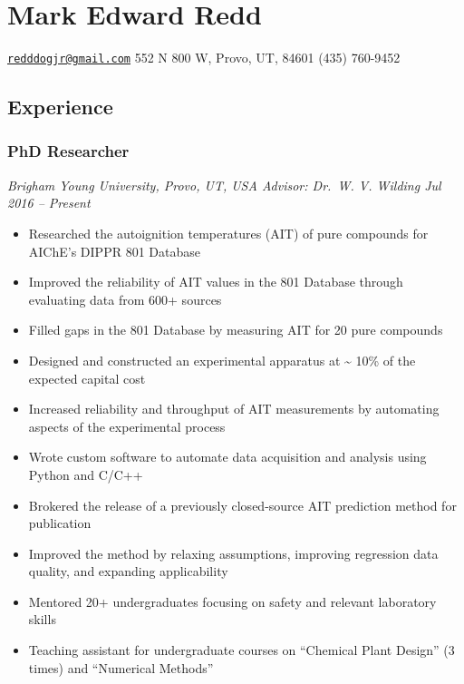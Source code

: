 
\hypertarget{mark-edward-redd}{%
\section{Mark Edward Redd}\label{mark-edward-redd}}

\href{mailto:redddogjr@gmail.com}{\nolinkurl{redddogjr@gmail.com}}
\textbar{} 552 N 800 W, Provo, UT, 84601 \textbar{} (435) 760-9452


\hypertarget{experience}{%
\subsection{Experience}\label{experience}}

\hypertarget{phd-researcher}{%
\subsubsection{PhD Researcher}\label{phd-researcher}}

\emph{Brigham Young University, Provo, UT, USA \textbar{} Advisor:
Dr.~W. V. Wilding \textbar{} Jul 2016 -- Present}

\begin{itemize}
\tightlist
\item
  Researched the autoignition temperatures (AIT) of pure compounds for
  AIChE's DIPPR 801 Database
\item
  Improved the reliability of AIT values in the 801 Database through
  evaluating data from 600+ sources
\item
  Filled gaps in the 801 Database by measuring AIT for 20 pure compounds
\item
  Designed and constructed an experimental apparatus at
  \textasciitilde{} 10\% of the expected capital cost
\item
  Increased reliability and throughput of AIT measurements by automating
  aspects of the experimental process
\item
  Wrote custom software to automate data acquisition and analysis using
  Python and C/C++
\item
  Brokered the release of a previously closed-source AIT prediction
  method for publication
\item
  Improved the method by relaxing assumptions, improving regression data
  quality, and expanding applicability
\item
  Mentored 20+ undergraduates focusing on safety and relevant laboratory
  skills
\item
  Teaching assistant for undergraduate courses on ``Chemical Plant
  Design'' (3 times) and ``Numerical Methods''
\end{itemize}

